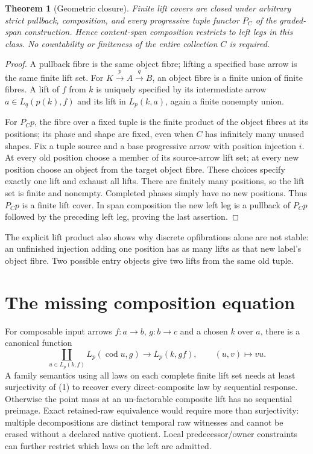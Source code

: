 \documentclass[11pt]{article}
\newtheorem{theorem}{Theorem}\newtheorem{proposition}{Proposition}
\begin{document}
\begin{theorem}[Geometric closure]
Finite lift covers are closed under arbitrary strict pullback, composition, and every progressive tuple functor $P_C$ of the graded-span construction. Hence content-span composition restricts to left legs in this class. No countability or finiteness of the entire collection $C$ is required.
\end{theorem}
\begin{proof}
A pullback fibre is the same object fibre; lifting a specified base arrow is the same finite lift set. For $K\xrightarrow p A\xrightarrow q B$, an object fibre is a finite union of finite fibres. A lift of $f$ from $k$ is uniquely specified by its intermediate arrow $a\in L_q(p(k),f)$ and its lift in $L_p(k,a)$, again a finite nonempty union.

For $P_Cp$, the fibre over a fixed tuple is the finite product of the object fibres at its positions; its phase and shape are fixed, even when $C$ has infinitely many unused shapes. Fix a tuple source and a base progressive arrow with position injection $i$. At every old position choose a member of its source-arrow lift set; at every new position choose an object from the target object fibre. These choices specify exactly one lift and exhaust all lifts. There are finitely many positions, so the lift set is finite and nonempty. Completed phases simply have no new positions. Thus $P_Cp$ is a finite lift cover. In span composition the new left leg is a pullback of $P_Cp$ followed by the preceding left leg, proving the last assertion.\end{proof}

The explicit lift product also shows why discrete opfibrations alone are not stable: an unfinished injection adding one position has as many lifts as that new label's object fibre. Two possible entry objects give two lifts from the same old tuple.

\section{The missing composition equation}
For composable input arrows $f:a\to b$, $g:b\to c$ and a chosen $k$ over $a$, there is a canonical function
\[
 \coprod_{u\in L_p(k,f)}L_p(\operatorname{cod}u,g)
       \longrightarrow L_p(k,gf),\qquad (u,v)\mapsto vu. \tag{1}
\]
A family semantics using all laws on each complete finite lift set needs at least surjectivity of (1) to recover every direct-composite law by sequential response. Otherwise the point mass at an un-factorable composite lift has no sequential preimage. Exact retained-raw equivalence would require more than surjectivity: multiple decompositions are distinct temporal raw witnesses and cannot be erased without a declared native quotient. Local predecessor/owner constraints can further restrict which laws on the left are admitted.
\end{document}
